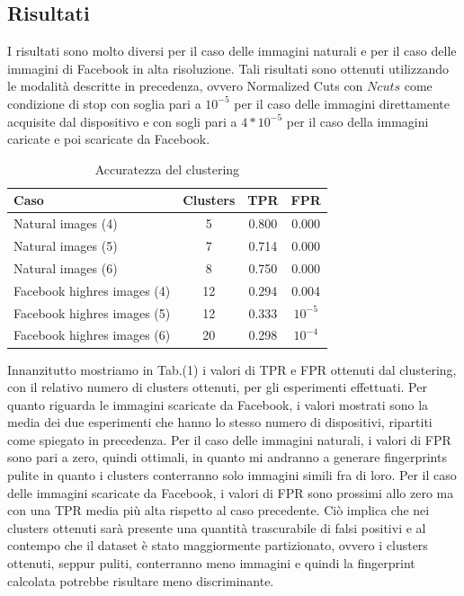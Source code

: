 \subsection{Risultati}

I risultati sono molto diversi per il caso delle immagini naturali e per il caso delle immagini di Facebook in alta risoluzione. Tali risultati sono ottenuti utilizzando le modalità descritte in precedenza, ovvero Normalized Cuts con $Ncuts$ come condizione di stop con soglia pari a $10^{-5}$ per il caso delle immagini direttamente acquisite dal dispositivo e con sogli pari a $4*10^{-5}$ per il caso della immagini caricate e poi scaricate da Facebook.

\begin{table}[ht]
\caption{Accuratezza del clustering}
\centering %
\begin{tabular}{l c c c} %
\hline\hline %
Caso & Clusters & TPR & FPR \\ [0.5ex] %
\hline %
Natural images (4) & 5 & 0.800 & 0.000 \\ %
Natural images (5) & 7 & 0.714 & 0.000 \\
Natural images (6) & 8 & 0.750 & 0.000 \\
Facebook highres images (4) & 12 & 0.294 & 0.004 \\
Facebook highres images (5) & 12 & 0.333 & $10^{-5}$ \\
Facebook highres images (6) & 20 & 0.298 & $10^{-4}$ \\ [1ex] %
\hline %
\end{tabular}
\label{table:nonlin} %
\end{table}

Innanzitutto mostriamo in Tab.(1) i valori di TPR e FPR ottenuti dal clustering, con il relativo numero di clusters ottenuti, per gli esperimenti effettuati. Per quanto riguarda le immagini scaricate da Facebook, i valori mostrati sono la media dei due esperimenti che hanno lo stesso numero di dispositivi, ripartiti come spiegato in precedenza.
Per il caso delle immagini naturali, i valori di FPR sono pari a zero, quindi ottimali, in quanto mi andranno a generare fingerprints pulite in quanto i clusters conterranno solo immagini simili fra di loro.
Per il caso delle immagini scaricate da Facebook, i valori di FPR sono prossimi allo zero ma con una TPR media più alta rispetto al caso precedente. Ciò implica che nei clusters ottenuti sarà presente una quantità trascurabile di falsi positivi e al contempo che il dataset è stato maggiormente partizionato, ovvero i clusters ottenuti, seppur puliti, conterranno meno immagini e quindi la fingerprint calcolata potrebbe risultare meno discriminante.

